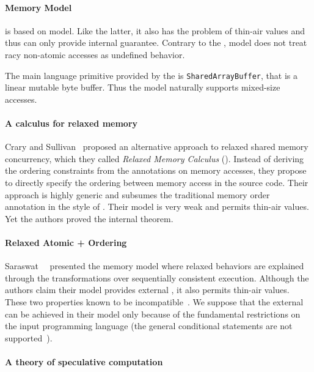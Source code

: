 \paragraph{\JS Memory Model}

\JSMM is based on \CMM model. 
Like the latter, it also has the problem of thin-air values
and thus can only provide internal \DRF guarantee. 
Contrary to the \CMM, \JS model does not treat 
racy non-atomic accesses as undefined behavior. 

The main language primitive provided by the \JSMM
is \texttt{SharedArrayBuffer}, that is a linear mutable byte buffer.
Thus the model naturally supports mixed-size accesses.

\paragraph{A calculus for relaxed memory}

Crary and Sullivan~\cite{Crary-Sullivan:POPL15} proposed 
an alternative approach to relaxed shared memory concurrency,
which they called \emph{Relaxed Memory Calculus} (\RMC).
Instead of deriving the ordering constraints from the annotations 
on memory accesses, they propose to directly specify 
the ordering between memory access in the source code. 
Their approach is highly generic and subsumes 
the traditional memory order annotation in the style of \CMM.
Their model is very weak and permits thin-air values. 
Yet the authors proved the internal \DRF theorem.

\paragraph{Relaxed Atomic + Ordering}

Saraswat~\etal~\cite{Saraswat-al:PPoPP07} presented the \RAO memory model
where relaxed behaviors are explained through the transformations 
over sequentially consistent execution.
Although the authors claim their model provides external \DRF,
it also permits thin-air values. 
These two properties known to be incompatible~\cite{Batty-al:ESOP15}.
We suppose that the external \DRF can be achieved in their model 
only because of the fundamental restrictions on the input programming language 
(\eg the general conditional statements are not supported~\cite{PichonPharabod-Sewell:POPL16}). 

\paragraph{A theory of speculative computation}

